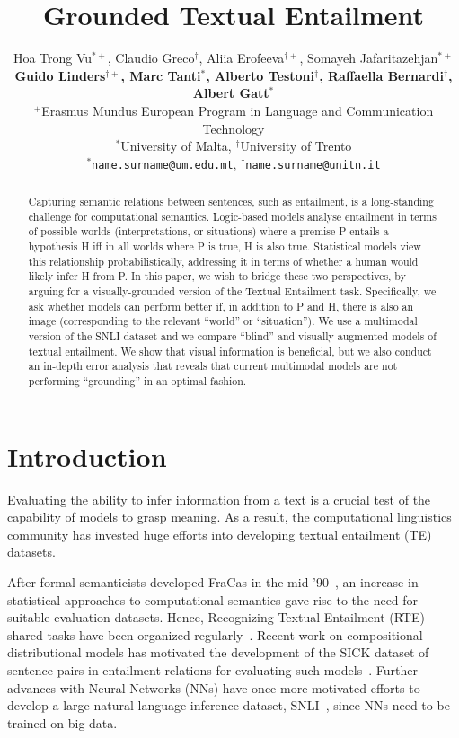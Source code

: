\documentclass[11pt]{article}
\title{Grounded Textual Entailment}
\author{Hoa Trong Vu$^{*+}$,  Claudio Greco$^\dagger$, Aliia Erofeeva$^{\dagger+}$, Somayeh Jafaritazehjan$^{*+}$\\
\textbf{Guido Linders$^{\dagger+}$, Marc Tanti$^*$,  Alberto  Testoni$^\dagger$,
 Raffaella Bernardi$^\dagger$, Albert Gatt$^*$}\\
 $^+$Erasmus Mundus European Program in Language and Communication
 Technology\\
$^*$University of Malta, $^\dagger$University of Trento \\
$^*${\tt name.surname@um.edu.mt},  $^\dagger${\tt name.surname@unitn.it}\\}
\date{}
\begin{document}
\maketitle

\begin{abstract}
Capturing semantic relations between sentences, such as entailment, is a long-standing challenge for computational semantics. Logic-based models analyse entailment in terms of possible worlds (interpretations, or situations) where a premise P entails a hypothesis H iff in all worlds where P is true, H is also true. Statistical models view this relationship probabilistically, addressing it in terms of whether a human would likely infer H from P. In this paper, we wish to bridge these two perspectives, by arguing for a visually-grounded version of the Textual Entailment task. Specifically, we ask whether models can perform better if, in addition to P and H, there is also an image (corresponding to the relevant ``world'' or ``situation''). We use a multimodal version of the SNLI dataset \cite{snli:emnlp2015} and we compare ``blind'' and visually-augmented models of textual entailment. We show that visual information is beneficial, but we also conduct an in-depth error analysis that reveals that current multimodal models are not performing ``grounding'' in an optimal fashion.
\end{abstract}

\section{Introduction}
\label{sec:introduction}

Evaluating the ability to infer information from a text is a crucial
 test of the capability of models to grasp meaning.  As a result,
the computational linguistics community has
invested huge efforts into developing textual entailment (TE) datasets.


After formal semanticists developed FraCas in the mid '90~\cite{coop:usin96},
an increase in statistical approaches to computational semantics 
gave rise to the need for suitable evaluation datasets.
Hence, Recognizing
Textual Entailment (RTE) shared tasks have been organized regularly~\cite{Sammons2012}.
Recent work on compositional distributional models has motivated the 
development of the SICK dataset
of sentence pairs in
entailment relations for evaluating such models~\cite{mare:sick14}.
Further advances with Neural Networks (NNs) have once more
motivated efforts to develop a large natural language inference
dataset, SNLI~\cite{snli:emnlp2015}, since NNs need to be trained on big data.  
\end{document}
